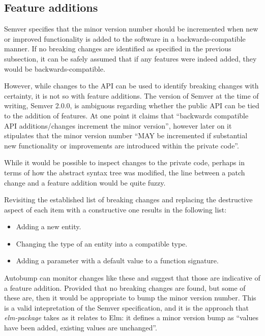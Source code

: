 \documentclass{l4proj}
\begin{document}
\subsection{Feature additions}

Semver specifies that the minor version number should be incremented
when new or improved functionality is added to the software in a
backwards-compatible manner. If no breaking changes are identified as
specified in the previous subsection, it can be safely assumed that if any
features were indeed added, they would be backwards-compatible.

However, while changes to the API can be used to identify breaking
changes with certainty, it is not so with feature additions. The
version of Semver at the time of writing, Semver 2.0.0, is ambiguous
regarding whether the public API can be tied to the addition of
features. At one point it claims that ``backwards compatible API
additions/changes increment the minor version'', however later on it
stipulates that the minor version number ``MAY be incremented if
substantial new functionality or improvements are introduced within
the private code''.

While it would be possible to inspect changes to the private code,
perhaps in terms of how the abstract syntax tree was modified, the
line between a patch change and a feature addition would be quite
fuzzy.

Revisiting the established list of breaking changes and replacing
the destructive aspect of each item with a constructive one results in
the following list:

\begin{itemize}
\item Adding a new entity.
\item Changing the type of an entity into a compatible type.
\item Adding a parameter with a default value to a function signature.
\end{itemize}

Autobump can monitor changes like these and suggest that those are
indicative of a feature addition. Provided that no breaking changes
are found, but some of these are, then it would be appropriate to bump
the minor version number. This is a valid intepretation of the Semver
specification, and it is the approach that \textit{elm-package} takes
\cite{ElmPackageVR} as it relates to Elm: it defines a minor version
bump as ``values have been added, existing values are unchanged''.
\end{document}
